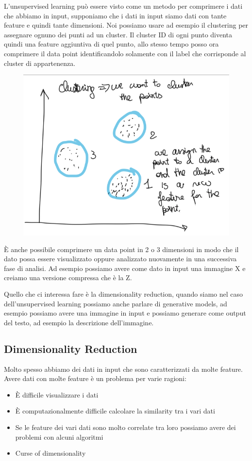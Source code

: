 \documentclass[14pt]{extreport}
\begin{document}
L'unsupervised learning può essere visto come un metodo per comprimere i dati che abbiamo in input, supponiamo che i dati in input
siamo dati con tante feature e quindi tante dimensioni. Noi possiamo usare ad esempio il clustering per assegnare ognuno dei punti
ad un cluster. Il cluster ID di ogni punto diventa quindi una feature aggiuntiva di quel punto, allo stesso tempo posso ora
comprimere il data point identificandolo solamente con il label che corrisponde al cluster di appartenenza.

\begin{figure}[H]
\centering
\includegraphics[width=0.4\linewidth]{434.jpeg}
\end{figure}

È anche possibile comprimere un data point in 2 o 3 dimensioni in modo che il dato possa essere visualizzato oppure analizzato
nuovamente in una successiva fase di analisi.
Ad esempio possiamo avere come dato in input una immagine X e creiamo una versione compressa che è la Z.

Quello che ci interessa fare è la dimensionality reduction, quando siamo nel caso dell'unsupervised learning possiamo anche parlare
di generative models, ad esempio possiamo avere una immagine in input e possiamo generare come output del testo, ad esempio 
la descrizione dell'immagine.

\subsection{Dimensionality Reduction}

Molto spesso abbiamo dei dati in input che sono caratterizzati da molte feature.
Avere dati con molte feature è un problema per varie ragioni:
\begin{itemize}
\item È difficile visualizzare i dati
\item È computazionalmente difficile calcolare la similarity tra i vari dati
\item Se le feature dei vari dati sono molto correlate tra loro possiamo avere dei problemi con alcuni algoritmi
\item Curse of dimensionality
\end{itemize}
\end{document}

